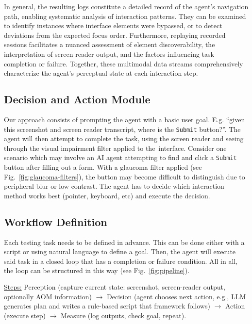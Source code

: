 In general, the resulting logs constitute a detailed record of the agent's navigation path, enabling systematic analysis of interaction patterns. They can be examined to identify instances where interface elements were bypassed, or to detect deviations from the expected focus order. Furthermore, replaying recorded sessions facilitates a nuanced assessment of element discoverability, the interpretation of screen reader output, and the factors influencing task completion or failure. Together, these multimodal data streams comprehensively characterize the agent's perceptual state at each interaction step. 


\subsection{Decision and Action Module}


Our approach consists of prompting the agent with a basic user goal. E.g. “given this screenshot and screen reader transcript, where is the \verb|Submit| button?”. The agent will then attempt to complete the task, using the screen reader and seeing through the visual impairment filter applied to the~interface.
Consider one scenario which may involve an \ac{AI} agent attempting to find and click a \verb|Submit| button after filling out a form. With a glaucoma filter applied (see Fig.~\ref{fig:glaucoma-filters}), the button may become difficult to distinguish due to peripheral blur or low contrast. The agent has to decide which interaction method works best (pointer, keyboard, etc) and execute the decision.

\subsection{Workflow Definition}

Each testing task needs to be defined in advance. This can be done either with a script or using natural language to define a goal. Then, the agent will execute said task in a closed loop that has a completion or failure condition. All in all, the loop can be structured in this way (see Fig.~\ref{fig:pipeline}).

\underline{Steps:} Perception (capture current state: screenshot, screen-reader output, optionally \ac{AOM} information) $\rightarrow$ Decision (agent chooses next action, e.g., LLM generates plan and writes a rule-based script that framework follows) $\rightarrow$ Action (execute step) $\rightarrow$ Measure (log outputs, check goal, repeat).


